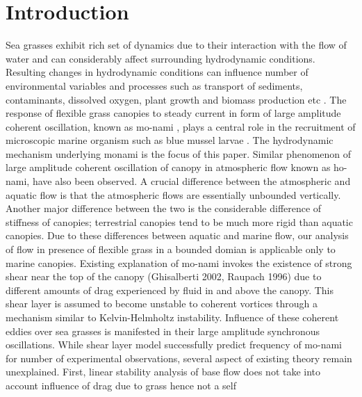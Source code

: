 \documentclass[aps,prl,twocolumn,showpacs,superscriptaddress,groupedaddress,10pt]{revtex4-1}  %
\begin{document}
\section{Introduction}
Sea grasses exhibit rich set of dynamics due to their interaction with the flow of water and can considerably affect surrounding hydrodynamic conditions.
Resulting changes in hydrodynamic conditions can influence number of environmental variables and processes such as 
transport of sediments, contaminants, dissolved oxygen, plant growth and biomass production etc \cite{Fonseca87}\cite{Nepf99}. 
The response of flexible grass canopies to steady current in form of large amplitude coherent oscillation, known as mo-nami \cite{AckermanOkubo93}, plays a central role
in the recruitment of microscopic marine organism such as blue mussel larvae \cite{Grizzle96}. The hydrodynamic mechanism underlying monami is the focus of this paper. 
\newline
Similar phenomenon of large amplitude coherent oscillation of canopy in atmospheric flow known as ho-nami\cite{Inoue56}\cite{Raupach96}, have also been observed.
A crucial difference between the atmospheric and aquatic flow is that the atmospheric flows are essentially unbounded vertically. Another major
difference between the two is the considerable difference of stiffness of canopies; terrestrial canopies tend to be much more rigid than aquatic canopies.
Due to these differences between aquatic and marine flow, our analysis of flow in presence of flexible grass in a bounded domian is applicable only to marine canopies. 
\newline   
Existing explanation of mo-nami invokes the existence of strong shear near the top of the canopy \cite{Ghisal02}\cite{Raupach96} (Ghisalberti 2002, Raupach 1996) due to
different amounts of drag experienced by fluid in and above the canopy. This shear layer is assumed to become unstable to coherent vortices through a mechanism similar to 
Kelvin-Helmholtz instability. Influence of these coherent eddies over sea grasses is manifested in their large amplitude synchronous oscillations.
\newline
While shear layer model successfully predict frequency of mo-nami for number of experimental observations,
several aspect of existing theory remain unexplained. First, linear stability analysis of base flow does not take into account influence of drag due to grass hence not a self 
\end{document}
